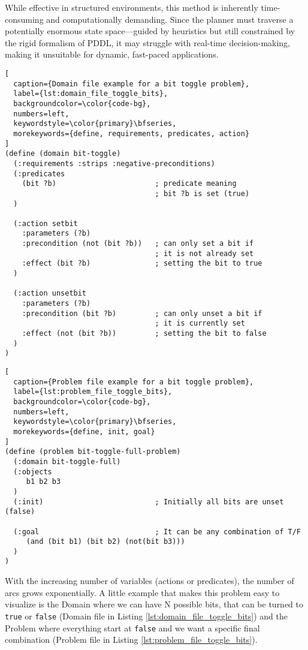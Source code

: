 While effective in structured environments, this method is inherently time-consuming
and computationally demanding. Since the planner must traverse a potentially enormous
state space—guided by heuristics but still constrained by the rigid formalism of
PDDL, it may struggle with real-time decision-making, making it unsuitable for dynamic,
fast-paced applications.

\begin{lstlisting}[
  caption={Domain file example for a bit toggle problem},
  label={lst:domain_file_toggle_bits},
  backgroundcolor=\color{code-bg},
  numbers=left,
  keywordstyle=\color{primary}\bfseries,
  morekeywords={define, requirements, predicates, action}
]
(define (domain bit-toggle)
  (:requirements :strips :negative-preconditions)
  (:predicates
    (bit ?b)                       ; predicate meaning
                                   ; bit ?b is set (true)
  )

  (:action setbit
    :parameters (?b)
    :precondition (not (bit ?b))   ; can only set a bit if
                                   ; it is not already set
    :effect (bit ?b)               ; setting the bit to true
  )

  (:action unsetbit
    :parameters (?b)
    :precondition (bit ?b)         ; can only unset a bit if
                                   ; it is currently set
    :effect (not (bit ?b))         ; setting the bit to false
  )
)
\end{lstlisting}

\begin{lstlisting}[
  caption={Problem file example for a bit toggle problem},
  label={lst:problem_file_toggle_bits},
  backgroundcolor=\color{code-bg},
  numbers=left,
  keywordstyle=\color{primary}\bfseries,
  morekeywords={define, init, goal}
]
(define (problem bit-toggle-full-problem)
  (:domain bit-toggle-full)
  (:objects
     b1 b2 b3
  )
  (:init)                          ; Initially all bits are unset (false)

  (:goal                           ; It can be any combination of T/F
     (and (bit b1) (bit b2) (not(bit b3)))
  )
)
\end{lstlisting}

With the increasing number of variables (actions or predicates), the number of arcs
grows exponentially. A little example that makes this problem easy to visualize
is the Domain where we can have N possible bits, that can be turned to \texttt{true}
or \texttt{false} (Domain file in Listing \ref{lst:domain_file_toggle_bits}) and
the Problem where everything start at \texttt{false} and we want a specific
final combination (Problem file in Listing \ref{lst:problem_file_toggle_bits}).

